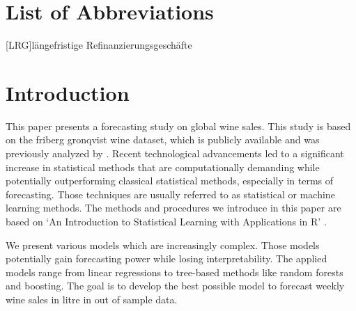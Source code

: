 \documentclass[11pt,]{article}
\begin{document}
\newpage
\listoffigures
{}

\listoftables
{}

\section*{List of Abbreviations}

\begin{adjustwidth}{1.5em}{0pt}

\begin{acronym}[dummyyyy]
 [LRG]{längefristige Refinanzierungsgeschäfte}

\end{acronym}

\end{adjustwidth}

\restoregeometry

\newpage
{}
\hypertarget{introduction}{%
\section{Introduction}\label{introduction}}

This paper presents a forecasting study on global wine sales. This study
is based on the friberg gronqvist wine dataset, which is publicly
available and was previously analyzed by
\textcite[][p. 193f.]{Friberg2012}. Recent technological advancements
led to a significant increase in statistical methods that are
computationally demanding while potentially outperforming classical
statistical methods, especially in terms of forecasting. Those
techniques are usually referred to as statistical or machine learning
methods. The methods and procedures we introduce in this paper are based
on `An Introduction to Statistical Learning with Applications in R'
\autocite[][]{James2014}.

We present various models which are increasingly complex. Those models
potentially gain forecasting power while losing interpretability. The
applied models range from linear regressions to tree-based methods like
random forests and boosting. The goal is to develop the best possible
model to forecast weekly wine sales in litre in out of sample data.
\end{document}
